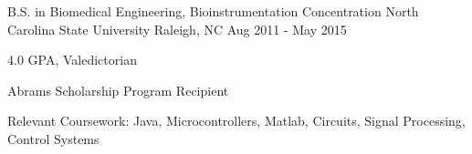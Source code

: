 

\begin{cventries}

  \cventry
    {B.S. in Biomedical Engineering, Bioinstrumentation Concentration} %
    {North Carolina State University} %
    {Raleigh, NC} %
    {Aug 2011 - May 2015} %
    {
      \begin{cvitems} %
        \item {4.0 GPA, Valedictorian}
        \item {Abrams Scholarship Program Recipient}
        \item {Relevant Coursework: Java, Microcontrollers, Matlab, Circuits, Signal Processing, Control Systems}
      \end{cvitems}
    }


\end{cventries}
